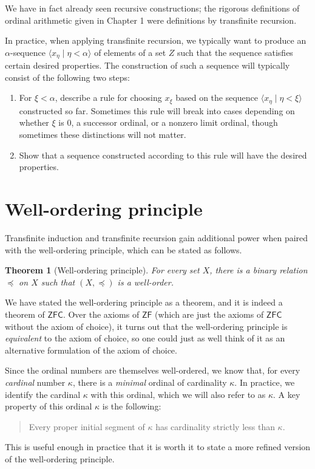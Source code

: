 \documentclass[a4paper]{memoir}
\newtheorem{theorem}{Theorem}[section]
\theoremstyle{definition}
\begin{document}
We have in fact already seen recursive constructions; the rigorous definitions of ordinal 
arithmetic given in Chapter 1 were definitions by transfinite recursion.

In practice, when applying transfinite recursion, we typically want to produce an $\alpha$-sequence 
$\langle x_\eta \mid \eta < \alpha \rangle$ of elements of a set $Z$ such that the sequence 
satisfies certain desired properties. The construction of such a sequence will typically 
consist of the following two steps:
\begin{enumerate}
  \item For $\xi < \alpha$, describe a rule for choosing $x_\xi$ based on the sequence 
  $\langle x_\eta \mid \eta < \xi \rangle$ constructed so far. Sometimes this rule will 
  break into cases depending on whether $\xi$ is $0$, a successor ordinal, or a nonzero 
  limit ordinal, though sometimes these distinctions will not matter.
  \item Show that a sequence constructed according to this rule will have the desired properties.
\end{enumerate}

\section{Well-ordering principle}

Transfinite induction and transfinite recursion gain additional power when paired with the 
well-ordering principle, which can be stated as follows.

\begin{theorem}[Well-ordering principle]
  For every set $X$, there is a binary relation $\preceq$ on $X$ such that $(X, \preceq)$ is a 
  well-order.
\end{theorem}

We have stated the well-ordering principle as a theorem, and it is indeed a theorem of 
$\mathsf{ZFC}$. Over the axioms of $\mathsf{ZF}$ (which are just the axioms of $\mathsf{ZFC}$ 
without the axiom of choice), it turns out that the well-ordering principle is 
\emph{equivalent} to the axiom of choice, so one could just as well think of it as 
an alternative formulation of the axiom of choice.

Since the ordinal numbers are themselves well-ordered, we know that, for every 
\emph{cardinal} number $\kappa$, there is a \emph{minimal} ordinal of cardinality 
$\kappa$. In practice, we identify the cardinal $\kappa$ with this ordinal, which we 
will also refer to as $\kappa$. A key property of this ordinal $\kappa$ is the following:
\begin{quote}
  Every proper initial segment of $\kappa$ has cardinality strictly less than $\kappa$.
\end{quote}
This is useful enough in practice that it is worth it to state a more refined version of 
the well-ordering principle.
\end{document}
